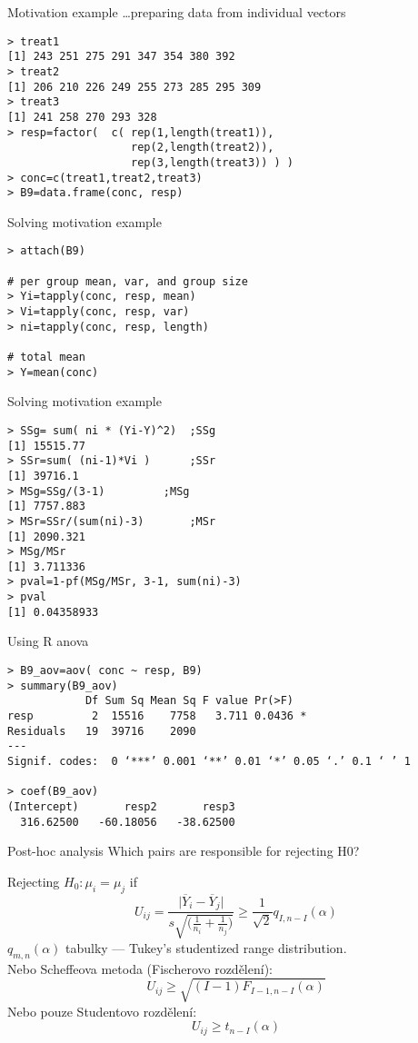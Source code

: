 \documentclass[smaller]{beamer}
\def\abs#1{\lvert#1\rvert}
\def\ol#1{\overline{#1}}
\def\blue#1{{\usebeamercolor[fg]{my blue} #1}}
\def\xskip{{\vspace{2ex}}}
\begin{document}
\begin{frame}[fragile]{Motivation example \dots preparing data}
\blue{from individual vectors}
\begin{verbatim}
> treat1
[1] 243 251 275 291 347 354 380 392
> treat2
[1] 206 210 226 249 255 273 285 295 309
> treat3
[1] 241 258 270 293 328
> resp=factor(  c( rep(1,length(treat1)),
                   rep(2,length(treat2)),
                   rep(3,length(treat3)) ) )  
> conc=c(treat1,treat2,treat3)
> B9=data.frame(conc, resp) 
\end{verbatim}
\end{frame}

\begin{frame}[fragile]{Solving motivation example}
\begin{verbatim}
> attach(B9)

# per group mean, var, and group size
> Yi=tapply(conc, resp, mean)
> Vi=tapply(conc, resp, var)
> ni=tapply(conc, resp, length)

# total mean
> Y=mean(conc)
\end{verbatim}
\end{frame}

\begin{frame}[fragile]{Solving motivation example}
\begin{verbatim}
> SSg= sum( ni * (Yi-Y)^2)	;SSg
[1] 15515.77
> SSr=sum( (ni-1)*Vi )		;SSr
[1] 39716.1
> MSg=SSg/(3-1)			;MSg
[1] 7757.883
> MSr=SSr/(sum(ni)-3)		;MSr
[1] 2090.321
> MSg/MSr
[1] 3.711336
> pval=1-pf(MSg/MSr, 3-1, sum(ni)-3)
> pval
[1] 0.04358933 
\end{verbatim}
\end{frame}

\begin{frame}[fragile]{Using R anova}
\begin{verbatim}
> B9_aov=aov( conc ~ resp, B9)
> summary(B9_aov)
            Df Sum Sq Mean Sq F value Pr(>F)  
resp         2  15516    7758   3.711 0.0436 *
Residuals   19  39716    2090                 
---
Signif. codes:  0 ‘***’ 0.001 ‘**’ 0.01 ‘*’ 0.05 ‘.’ 0.1 ‘ ’ 1 

> coef(B9_aov)
(Intercept)       resp2       resp3 
  316.62500   -60.18056   -38.62500 
\end{verbatim}
\end{frame}

\begin{frame}{Post-hoc analysis}
Which pairs are responsible for rejecting H0?

\xskip
 Rejecting $H_0: \mu_i = \mu_j$ if
 \[
   U_{ij} = \frac{ \abs{\ol{Y}_i - \ol{Y}_j} }{ s \sqrt{\big(\frac{1}{n_i} + \frac{1}{n_j} \big)} } 
   \ge \frac{1}{\sqrt{2}} q_{I,n-I}(\alpha)
 \]
 $q_{m,n}(\alpha)$ tabulky --- Tukey's studentized range distribution.\\
 Nebo Scheffeova metoda (Fischerovo rozdělení):
 \[
    U_{ij} \ge \sqrt{(I-1)F_{I-1,n-I}(\alpha)}
 \]
 Nebo pouze Studentovo rozdělení:
 \[
     U_{ij} \ge t_{n-I}(\alpha)
 \] 
\end{frame}
\end{document}
